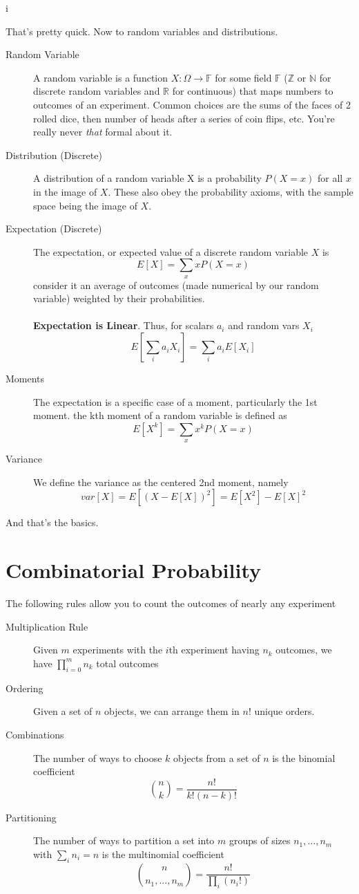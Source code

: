 i\documentclass[10pt]{article}
\begin{document}
That's pretty quick. Now to random variables and distributions.
\begin{description}
    \item[Random Variable] A random variable is a function $X: \Omega \rightarrow \mathbb{F}$ for some field 
        $\mathbb{F}$ ($\mathbb{Z}$ or $\mathbb{N}$ for discrete random variables and $\mathbb{R}$ for continuous)
        that maps numbers to outcomes of an experiment. Common choices are the sums of the faces of
        2 rolled dice, then number of heads after a series of coin flips, etc. You're really never
        \textit{that} formal about it.
    \item[Distribution (Discrete)] A distribution of a random variable X is a
        probability $P(X = x)$ for all $x$ in the image of $X$. These also obey the
        probability axioms, with the sample space being the image
        of $X$.
    \item[Expectation (Discrete)] The expectation, or expected value of a discrete random variable $X$ is 
        \[ E[X] = \sum_{x} x P(X = x) \]
        consider it an average of outcomes (made numerical by our random variable)  weighted by their 
        probabilities. \\\\
        \textbf{Expectation is Linear}. Thus, for scalars ${a_i}$ and random vars ${X_i}$
        \[ E\left[\sum_i a_iX_i\right] = \sum_i a_iE[X_i] \]
    \item[Moments] The expectation is a specific case of a moment, particularly the 1st moment. the kth moment
        of a random variable is defined as
        \[ E[X^k] = \sum_x x^k P(X = x) \]
    \item[Variance] We define the variance as the centered 2nd moment, namely
        \[ var[X] = E[(X - E[X])^2] = E[X^2] - E[X]^2 \]
\end{description}

And that's the basics.

\section{Combinatorial Probability}

The following rules allow you to count the outcomes of nearly any experiment

\begin{description}
    \item[Multiplication Rule] Given $m$ experiments with the $i$th experiment having $n_k$ outcomes, we have 
        $\prod_{i = 0}^{m} n_k$ total outcomes
    \item[Ordering] Given a set of $n$ objects, we can arrange them in $n!$ unique orders.
    \item[Combinations] The number of ways to choose $k$ objects from a set of $n$ is the binomial coefficient 
        \[ \binom{n}{k} = \frac{n!}{k!(n-k)!} \]
    \item[Partitioning] The number of ways to partition a set into $m$ groups of sizes $n_1, ..., n_m$ with 
        $\sum_i n_i = n$ is the multinomial coefficient
        \[ \binom{n}{n_1, ..., n_m} = \frac{n!}{\prod_i (n_i!)} \]
\end{description}
\end{document}
